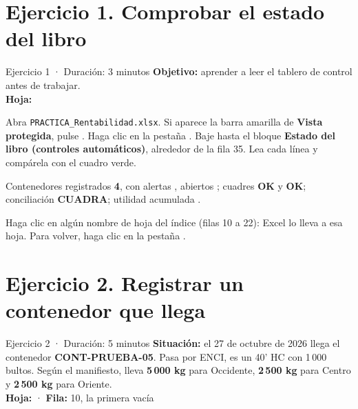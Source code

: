 \section{Ejercicio 1. Comprobar el estado del libro}

\begin{ficha}{Ejercicio 1 · Duración: 3 minutos}
\textbf{Objetivo:} aprender a leer el tablero de control antes de trabajar.\\
\textbf{Hoja:} 
\end{ficha}

\begin{pasos}
\paso Abra \texttt{PRACTICA\_Rentabilidad.xlsx}. Si aparece la barra amarilla de \textbf{Vista protegida}, pulse .
\paso Haga clic en la pestaña .
\paso Baje hasta el bloque \textbf{Estado del libro (controles automáticos)}, alrededor de la fila 35.
\paso Lea cada línea y compárela con el cuadro verde.
\end{pasos}


\begin{resultado}
Contenedores registrados \textbf{4}, con alertas \textbf{\vAlertasIni}, abiertos \textbf{\vAbiertosIni};
cuadres \textbf{OK} y \textbf{OK}; conciliación \textbf{CUADRA}; utilidad acumulada \textbf{\vUAItotal}.
\end{resultado}

\begin{nota}
Haga clic en algún nombre de hoja del índice (filas 10 a 22): Excel lo lleva a esa hoja. Para volver, haga clic en la pestaña .
\end{nota}

\section{Ejercicio 2. Registrar un contenedor que llega}\label{sec:ej2}

\begin{ficha}{Ejercicio 2 · Duración: 5 minutos}
\textbf{Situación:} el 27 de octubre de 2026 llega el contenedor \textbf{CONT-PRUEBA-05}. Pasa por ENCI, es un 40' HC con 1\,000 bultos.
Según el manifiesto, lleva \textbf{5\,000 kg} para Occidente, \textbf{2\,500 kg} para Centro y \textbf{2\,500 kg} para Oriente.\\
\textbf{Hoja:}  · \textbf{Fila:} 10, la primera vacía
\end{ficha}


